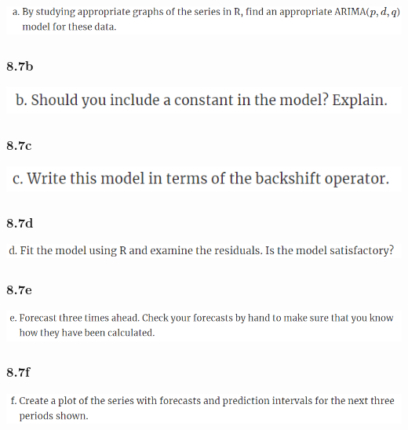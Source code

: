 \documentclass[]{book}
\begin{document}
\includegraphics{./week5/8.7a.png}

\hypertarget{b-8}{%
\subsubsection{8.7b}\label{b-8}}

\includegraphics{./week5/8.7b.png}

\hypertarget{c-7}{%
\subsubsection{8.7c}\label{c-7}}

\includegraphics{./week5/8.7c.png}

\hypertarget{d-4}{%
\subsubsection{8.7d}\label{d-4}}

\includegraphics{./week5/8.7d.png}

\hypertarget{e-4}{%
\subsubsection{8.7e}\label{e-4}}

\includegraphics{./week5/8.7e.png}

\hypertarget{f-4}{%
\subsubsection{8.7f}\label{f-4}}

\includegraphics{./week5/8.7f.png}
\end{document}
